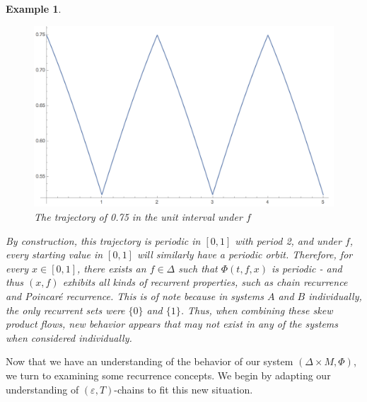 \documentclass[11pt]{article}
\newtheorem{ex}[thm]{Example}
\begin{document}
\begin{ex}
\begin{figure}[!ht]\label{figure}
\begin{center}
\includegraphics[scale=0.45]{oscsys4}
\caption{The trajectory of 0.75 in the unit interval under $f$}
\end{center}
\end{figure}
\noindent By construction, this trajectory is periodic in $[0,1]$ with period 2, and under $f$, every starting value in $[0,1]$ will similarly have a periodic orbit. Therefore, for every $x\in[0,1]$, there exists an $f\in\Delta$ such that $\Phi(t,f,x)$ is periodic - and thus $(x,f)$ exhibits all kinds of recurrent properties, such as chain recurrence and Poincar\'e recurrence.  This is of note because in systems $A$ and $B$ individually, the only recurrent sets were $\{0\}$ and $\{1\}$.   Thus, when combining these skew product flows, new behavior appears that may not exist in any of the systems when considered individually.  \end{ex}

\indent Now that we have an understanding of the behavior of our system $(\Delta\times M, \Phi)$, we turn to examining some recurrence concepts.  We begin by adapting our understanding of $(\varepsilon,T)$-chains to fit this new situation. 
\end{document}
